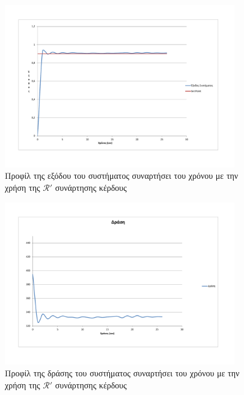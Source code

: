 \documentclass[11pt]{article} %
\numberwithin{equation}{subsection}
\begin{document}
\begin{figure}[H]
    \centering
    \includegraphics[width=0.9\textwidth]{siso_output_3_reward_09.pdf}
    \caption{Προφίλ της εξόδου του συστήματος συναρτήσει του χρόνου με την χρήση της $\mathcal{R}'$ συνάρτησης κέρδους}
    \label{fig:siso_output_3_rewards}
\end{figure}

\begin{figure}[H]
    \centering
    \includegraphics[width=0.9\textwidth]{siso_action_3_reward_09.pdf}
    \caption{Προφίλ της δράσης του συστήματος συναρτήσει του χρόνου με την χρήση της $\mathcal{R}'$ συνάρτησης κέρδους}
    \label{fig:siso_action_3_rewards}
\end{figure}
\end{document}
